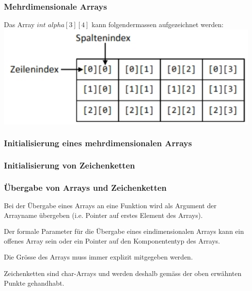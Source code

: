 		\hspace*{0.5cm}
		\begin{minipage}[t]{9 cm}	
			\subsubsection{Mehrdimensionale Arrays }
				Das Array $int$ $alpha[3][4]$ kann folgendermassen aufgezeichnet werden: \\
				\includegraphics[width=1\textwidth]{pics/array_mehrdimensional.jpg}
			
			\subsubsection{Initialisierung eines mehrdimensionalen Arrays }
				
		\end{minipage}

		\subsubsection{Initialisierung von Zeichenketten }
			
			
		\subsubsection{Übergabe von Arrays und Zeichenketten }
			\begin{compactitem}
				\item Bei der Übergabe eines Arrays an eine Funktion wird als Argument der Arrayname übergeben (i.e. Pointer auf erstes Element des Arrays).
				\item Der formale Parameter für die Übergabe eines eindimensionalen Arrays kann ein offenes Array sein oder ein Pointer auf den Komponententyp des Arrays.
				\item Die Grösse des Arrays muss immer explizit mitgegeben werden.
				\item Zeichenketten sind char-Arrays und werden deshalb gemäss der oben erwähnten Punkte gehandhabt.
			\end{compactitem}
			
			
